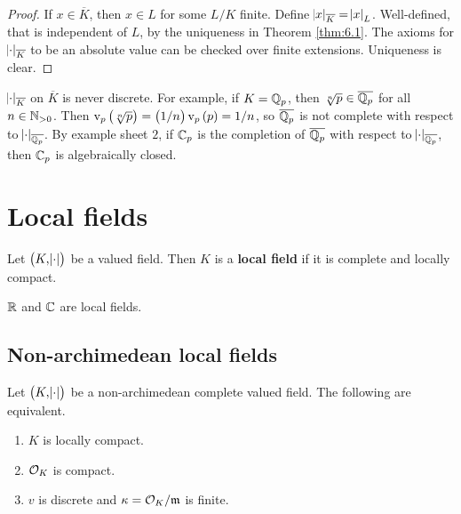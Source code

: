 \begin{proof}
If $ x \in \overline{K} $, then $ x \in L $ for some $ L / K $ finite. Define $ \abs{x}_{\overline{K}} = \abs{x}_L $. Well-defined, that is independent of $ L $, by the uniqueness in Theorem \ref{thm:6.1}. The axioms for $ \abs{\cdot}_{\overline{K}} $ to be an absolute value can be checked over finite extensions. Uniqueness is clear.
\end{proof}

\begin{remark*}
$ \abs{\cdot}_{\overline{K}} $ on $ \overline{K} $ is never discrete. For example, if $ K = \mathbb{Q}_p $, then $ \sqrt[n]{p} \in \overline{\mathbb{Q}_p} $ for all $ n \in \mathbb{N}_{> 0} $. Then $ \v_p\br{\sqrt[n]{p}} = \br{1 / n}\v_p\br{p} = 1 / n $, so $ \overline{\mathbb{Q}_p} $ is not complete with respect to $ \abs{\cdot}_{\overline{\mathbb{Q}_p}} $. By example sheet $ 2 $, if $ \mathbb{C}_p $ is the completion of $ \overline{\mathbb{Q}_p} $ with respect to $ \abs{\cdot}_{\overline{\mathbb{Q}_p}} $, then $ \mathbb{C}_p $ is algebraically closed.
\end{remark*}

\pagebreak

\section{Local fields}

\begin{definition}
Let $ \br{K, \abs{\cdot}} $ be a valued field. Then $ K $ is a \textbf{local field} if it is complete and locally compact.
\end{definition}

\begin{example*}
$ \mathbb{R} $ and $ \mathbb{C} $ are local fields.
\end{example*}

\subsection{Non-archimedean local fields}

\begin{proposition}
Let $ \br{K, \abs{\cdot}} $ be a non-archimedean complete valued field. The following are equivalent.
\begin{enumerate}
\item $ K $ is locally compact.
\item $ \mathcal{O}_K $ is compact.
\item $ v $ is discrete and $ \kappa = \mathcal{O}_K / \mathfrak{m} $ is finite.
\end{enumerate}
\end{proposition}

